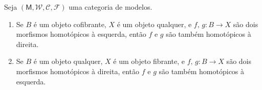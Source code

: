 \begin{prop}\label{prop:comparando_homotopia_esquerda_homotopia_direita}
  Seja $(\mathsf{M},\mathcal{W},\mathcal{C},\mathcal{F})$ uma categoria de modelos.
  \begin{enumerate}
  \item Se $B$ é um objeto cofibrante, $X$ é um objeto qualquer, e $f,\,g: B \to X$ são dois morfismos homotópicos à esquerda, então $f$ e $g$ são também homotópicos à direita.
    
  \item Se $B$ é um objeto qualquer, $X$ é um objeto fibrante, e $f,\,g: B \to X$ são dois morfismos homotópicos à direita, então $f$ e $g$ são também homotópicos à esquerda.
  \end{enumerate}
\end{prop}

